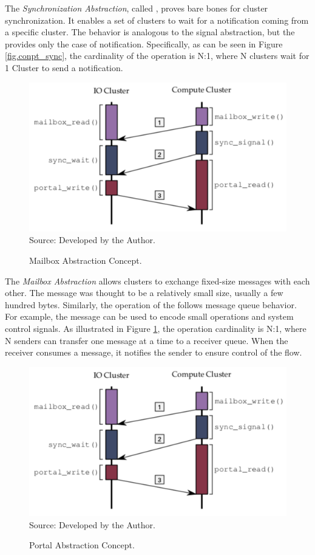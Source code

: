 				The \textit{Synchronization Abstraction}, called \sync, proves bare bones
				for cluster synchronization.
				It enables a set of clusters to wait for a notification coming from a
				specific cluster.
				The behavior is analogous to the \posix signal abstraction, but the \sync
				provides only the case of notification.
				Specifically, as can be seen in Figure \ref{fig.conpt_sync}, the
				cardinality of the operation is N:1, where N clusters wait for 1 Cluster
				to send a notification.

			\label{sec.mailbox-abs}

				\begin{figure}[t]
					\centering
					\caption{Mailbox Abstraction Concept.}
					\includegraphics[width=.7\textwidth]{images/conceptual-sync.png}
					Source: Developed by the Author.
					\label{fig.conpt_mailbox}
				\end{figure}

				The \textit{Mailbox Abstraction} allows clusters to exchange fixed-size
				messages with each other.
				The message was thought to be a relatively small size, usually a few hundred bytes.
				Similarly, the operation of the \mailbox follows \posix message queue behavior.
				For example, the message can be used to encode small operations and system
				control signals.
				As illustrated in Figure \ref{fig.conpt_mailbox}, the operation cardinality is N:1,
				where N senders can transfer one message at a time to a receiver queue.
				When the receiver consumes a message, it notifies the sender to ensure
				control of the flow.

			\label{sec.portal-abs}

				\begin{figure}[t]
					\centering
					\caption{Portal Abstraction Concept.}
					\includegraphics[width=.7\textwidth]{images/conceptual-sync.png}
					Source: Developed by the Author.
					\label{fig.conpt_portal}
				\end{figure}

